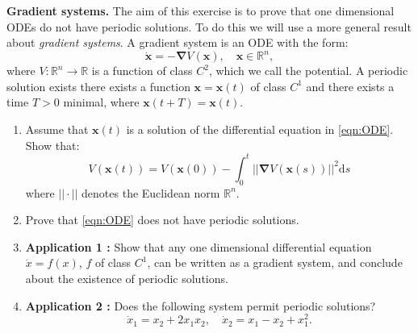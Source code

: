 \documentclass{article}
\newcommand{\diff}{\text{d}}
\begin{document}
\begin{question}
\textbf{Gradient systems.} The aim of this exercise is to prove that one dimensional ODEs do not have periodic solutions. To do this we will use a more general result about \textit{gradient systems}. A gradient system is an ODE with the form:
\begin{equation}
  \dot{\bm x} = -\bm \nabla V(\bm x), \quad \bm x\in \mathbb R^n,
  \label{eqn:ODE}
\end{equation}
where $V: \mathbb R^n \to \mathbb R$  is a function of class $C^2$, which we call the potential. A periodic solution exists there exists a function $\bm x = \bm x(t)$ of class $C^1$ and there exists a time $T>0$ minimal, where $\bm x(t+T) = \bm x(t)$.
\begin{enumerate}[label=(\alph*)]
  \item Assume that $\bm x(t)$ is a solution of the differential equation in \eqref{eqn:ODE}. Show that:
  \begin{equation}
    V(\bm x(t)) = V(\bm x(0))-\int_0^t ||\bm\nabla V(\bm x(s))||^2\diff s
    \label{eqn:VEvolution}
  \end{equation}
  where $||\cdot ||$ denotes the Euclidean norm $\mathbb R^n$.

  \item Prove that \eqref{eqn:ODE} does not have periodic solutions.
    \item \textbf{Application 1 :} Show that any one dimensional differential equation $\dot x = f(x)$, $f$ of class $C^1$, can be written as a gradient system, and conclude about the existence of periodic solutions.
  \item \textbf{Application 2 :} Does the following system permit periodic solutions? 
  \begin{equation}
    \dot x_1 =x_2+2x_1x_2, \quad \dot x_2 = x_1 - x_2+x_1^2.
  \end{equation}
  \end{enumerate}

\end{question}
\end{document}
